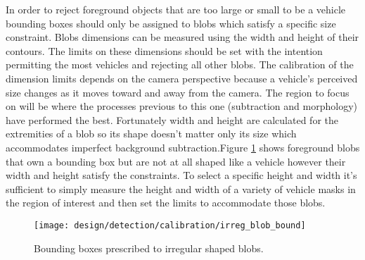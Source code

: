 In order to reject foreground objects that are too large or small to be a vehicle bounding boxes should only be assigned to blobs which satisfy a specific size constraint. Blobs dimensions can be measured using the width and height of their contours. The limits on these dimensions should be set with the intention permitting the most vehicles and rejecting all other blobs. The calibration of the dimension limits depends on the camera perspective because a vehicle's perceived size changes as it moves toward and away from the camera. The region to focus on will be where the processes previous to this one (subtraction and morphology) have performed the best. Fortunately width and height are calculated for the extremities of a blob so its shape doesn't matter only its size which accommodates imperfect background subtraction.Figure \ref{fig:irreg_blob} shows foreground blobs that own a bounding box but are not at all shaped like a vehicle however their width and height satisfy the constraints. To select a specific height and width it's sufficient to simply measure the height and width of a variety of vehicle masks in the region of interest and then set the limits to accommodate those blobs. 


\begin{figure}[H]
    \centering
    \centering\texttt{[image: design/detection/calibration/irreg\_blob\_bound]}
    \caption{Bounding boxes prescribed to irregular shaped blobs.}
    \label{fig:irreg_blob}
  \end{figure}

  

  
